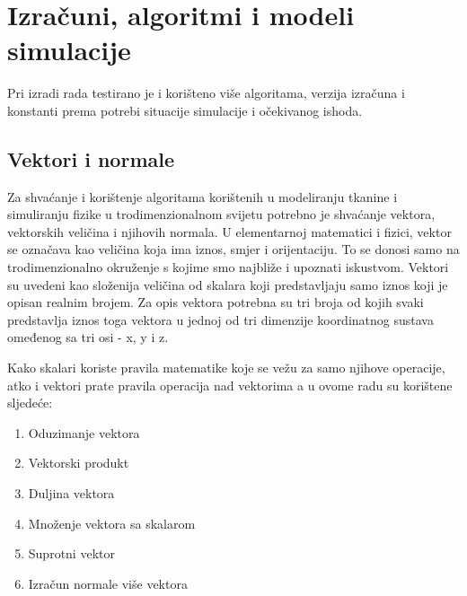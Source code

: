 \chapter{Izračuni, algoritmi i modeli simulacije}

Pri izradi rada testirano je i korišteno više algoritama, verzija izračuna i konstanti prema potrebi situacije simulacije i očekivanog ishoda.

\section{Vektori i normale}

Za shvaćanje i korištenje algoritama korištenih u modeliranju tkanine i simuliranju fizike u trodimenzionalnom svijetu potrebno je shvaćanje vektora, vektorskih veličina i njihovih normala. 
U elementarnoj matematici i fizici, vektor se označava kao veličina koja ima iznos, smjer i orijentaciju. To se donosi samo na trodimenzionalno okruženje s kojime smo najbliže i upoznati iskustvom. Vektori su uvedeni kao složenija veličina od skalara koji predstavljaju samo iznos koji je opisan realnim brojem. Za opis vektora potrebna su tri broja od kojih svaki predstavlja iznos toga vektora u jednoj od tri dimenzije koordinatnog sustava omeđenog sa tri osi - x, y i z.

Kako skalari koriste pravila matematike koje se vežu za samo njihove operacije, atko i vektori prate pravila operacija nad vektorima a u ovome radu su korištene sljedeće:

\begin{enumerate}
    \item Oduzimanje vektora
    \item Vektorski produkt
    \item Duljina vektora
    \item Množenje vektora sa skalarom
    \item Suprotni vektor
    \item Izračun normale više vektora
\end{enumerate}

\section{}